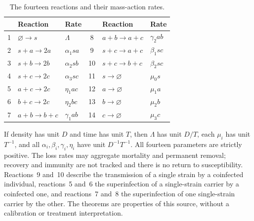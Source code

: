 \documentclass[11pt,a4paper]{article}
\theoremstyle{plain}
\theoremstyle{definition}
\theoremstyle{remark}
\begin{document}
\begin{table}[ht]
\centering
\caption{The fourteen reactions and their mass-action rates.}\label{tab:reactions}
\begin{tabular}{cll@{\qquad}cll}
\toprule
 & Reaction & Rate & & Reaction & Rate\\
\midrule
1 & $\varnothing\to s$ & $\Lambda$ & 8 & $a+b\to a+c$ & $\gamma_2ab$\\
2 & $s+a\to2a$ & $\alpha_1sa$ & 9 & $s+c\to a+c$ & $\beta_1sc$\\
3 & $s+b\to2b$ & $\alpha_2sb$ & 10 & $s+c\to b+c$ & $\beta_2sc$\\
4 & $s+c\to2c$ & $\alpha_3sc$ & 11 & $s\to\varnothing$ & $\mu_0s$\\
5 & $a+c\to2c$ & $\eta_1ac$ & 12 & $a\to\varnothing$ & $\mu_1a$\\
6 & $b+c\to2c$ & $\eta_2bc$ & 13 & $b\to\varnothing$ & $\mu_2b$\\
7 & $a+b\to b+c$ & $\gamma_1ab$ & 14 & $c\to\varnothing$ & $\mu_3c$\\
\bottomrule
\end{tabular}
\end{table}

If density has unit $D$ and time has unit $T$, then $\Lambda$ has unit $D/T$, each $\mu_i$ has unit $T^{-1}$, and all $\alpha_i,\beta_i,\gamma_i,\eta_i$ have unit $D^{-1}T^{-1}$. All fourteen parameters are strictly positive. The loss rates may aggregate mortality and permanent removal; recovery and immunity are not tracked and there is no return to susceptibility. Reactions~9 and~10 describe the transmission of a single strain by a coinfected individual, reactions~5 and~6 the superinfection of a single-strain carrier by a coinfected one, and reactions~7 and~8 the superinfection of one single-strain carrier by the other. The theorems are properties of this source, without a calibration or treatment interpretation.
\end{document}
